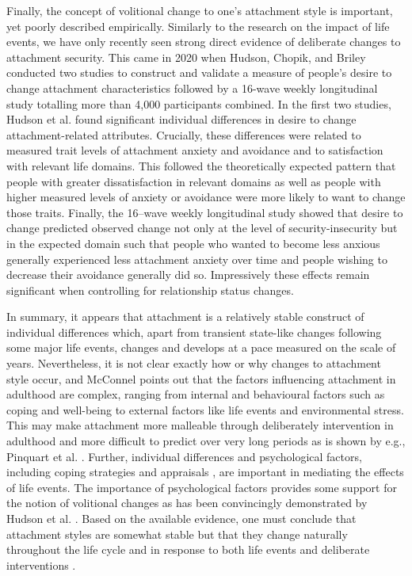 \documentclass[12pt]{report}
\begin{document}
Finally, the concept of volitional change to one's attachment style is important, yet poorly described empirically.
Similarly to the research on the impact of life events, we have only recently seen strong direct evidence of deliberate changes to attachment security. This came in 2020 when Hudson, Chopik, and Briley \citeyear{Hudson2020} conducted two studies to construct and validate a measure of people's desire to change attachment characteristics followed by a 16-wave weekly longitudinal study totalling more than 4,000 participants combined.
In the first two studies, Hudson et al. found significant individual differences in desire to change attachment-related attributes.
Crucially, these differences were related to measured trait levels of attachment anxiety and avoidance and to satisfaction with relevant life domains. This followed the theoretically expected pattern that people with greater dissatisfaction in relevant domains as well as people with higher measured levels of anxiety or avoidance were more likely to want to change those traits.
Finally, the 16–wave weekly longitudinal study showed that desire to change predicted observed change not only at the level of security-insecurity but in the expected domain such that people who wanted to become less anxious generally experienced less attachment anxiety over time and people wishing to decrease their avoidance generally did so. Impressively these effects remain significant when controlling for relationship status changes.

In summary, it appears that attachment is a relatively stable construct of individual differences which, apart from transient state-like changes following some major life events, changes and develops at a pace measured on the scale of years.
Nevertheless, it is not clear exactly how or why changes to attachment style occur, and McConnel \citeyear{McConnell2011} points out that the factors influencing attachment in adulthood are complex, ranging from internal and behavioural factors such as coping and well-being to external factors like life events and environmental stress.
This may make attachment more malleable through deliberately intervention in adulthood and more difficult to predict over very long periods as is shown by e.g., Pinquart et al. \citeyear{Pinquart2013}.
Further, individual differences and psychological factors, including coping strategies \cite{Zhang2004} and appraisals \cite{Fraley2021}, are important in mediating the effects of life events. The importance of psychological factors provides some support for the notion of volitional changes as has been convincingly demonstrated by Hudson et al. \citeyear{Hudson2020}.
Based on the available evidence, one must conclude that attachment styles are somewhat stable but that they change naturally throughout the life cycle \cite{Rowe2005,Doherty2004,Fraley1997} and in response to both life events \cite{Fraley2021} and deliberate interventions \cite{Hudson2020}.
\end{document}
